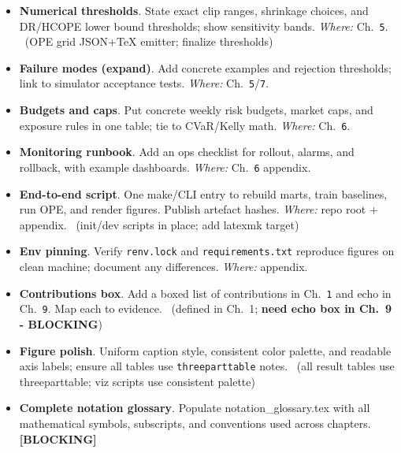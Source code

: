 \begin{itemize}
  \item {} \textbf{Numerical thresholds}. State exact clip ranges, shrinkage choices, and DR/HCOPE lower bound thresholds; show sensitivity bands. \emph{Where:} Ch.~\texttt{5}. \done\ (OPE grid JSON+TeX emitter; finalize thresholds)
  \item {} \textbf{Failure modes (expand)}. Add concrete examples and rejection thresholds; link to simulator acceptance tests. \emph{Where:} Ch.~\texttt{5}/\texttt{7}.
\end{itemize}

\begin{itemize}
  \item {} \textbf{Budgets and caps}. Put concrete weekly risk budgets, market caps, and exposure rules in one table; tie to CVaR/Kelly math. \emph{Where:} Ch.~\texttt{6}.
  \item {} \textbf{Monitoring runbook}. Add an ops checklist for rollout, alarms, and rollback, with example dashboards. \emph{Where:} Ch.~\texttt{6} appendix.
\end{itemize}

\begin{itemize}
  \item {} \textbf{End-to-end script}. One make/CLI entry to rebuild marts, train baselines, run OPE, and render figures. Publish artefact hashes. \emph{Where:} repo root + appendix. \wip\ (init/dev scripts in place; add latexmk target)
  \item {} \textbf{Env pinning}. Verify \texttt{renv.lock} and \texttt{requirements.txt} reproduce figures on clean machine; document any differences. \emph{Where:} appendix. \wip
\end{itemize}

\begin{itemize}
  \item {} \textbf{Contributions box}. Add a boxed list of contributions in Ch.~\texttt{1} and echo in Ch.~\texttt{9}. Map each to evidence. \wip\ (defined in Ch.~1; \textbf{need echo box in Ch.~9 - BLOCKING})
  \item {} \textbf{Figure polish}. Uniform caption style, consistent color palette, and readable axis labels; ensure all tables use \texttt{threeparttable} notes. \done\ (all result tables use threeparttable; viz scripts use consistent palette)
  \item {} \textbf{Complete notation glossary}. Populate notation\_glossary.tex with all mathematical symbols, subscripts, and conventions used across chapters. \textbf{[BLOCKING]}
\end{itemize}

